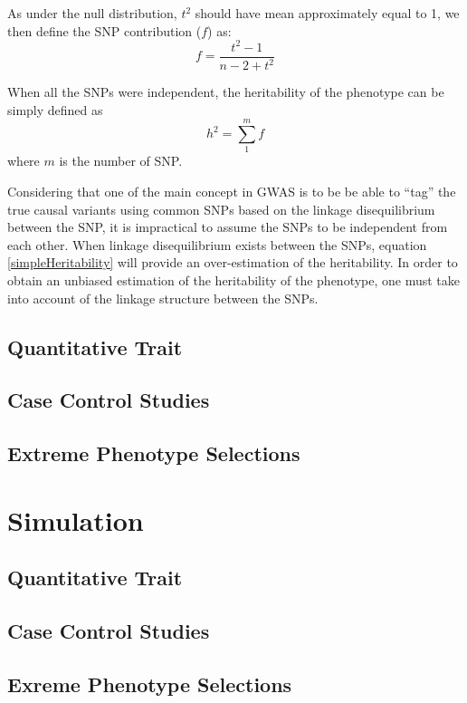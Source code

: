 \documentclass{book}
\begin{document}
		As under the null distribution, $t^2$ should have mean approximately equal to 1, we then define the \acrshort{SNP} contribution ($f$) as:
		\begin{equation}
		f = \frac{t^2-1}{n-2+t^2}
		\label{snpContribution}
		\end{equation} 
		
		When all the \acrshort{SNP}s were independent, the heritability of the phenotype can be simply defined as
		\begin{equation}
			h^2 = \sum^m_1{f}
			\label{simpleHeritability}
		\end{equation}
		where $m$ is the number of \acrshort{SNP}.
		
		Considering that one of the main concept in \acrshort{GWAS} is to be be able to ``tag'' the true causal variants using common \acrshort{SNP}s based on the linkage disequilibrium between the \acrshort{SNP}, it is impractical to assume the \acrshort{SNP}s to be independent from each other. 
		When linkage disequilibrium exists between the \acrshort{SNP}s, equation \ref{simpleHeritability} will provide an over-estimation of the heritability. 
		In order to obtain an unbiased estimation of the heritability of the phenotype, one must take into account of the linkage structure between the \acrshort{SNP}s.
	\subsection{Quantitative Trait}
	\subsection{Case Control Studies}
	\subsection{Extreme Phenotype Selections}
	\section{Simulation}
	\subsection{Quantitative Trait}
	\subsection{Case Control Studies}
	\subsection{Exreme Phenotype Selections}
\end{document}
